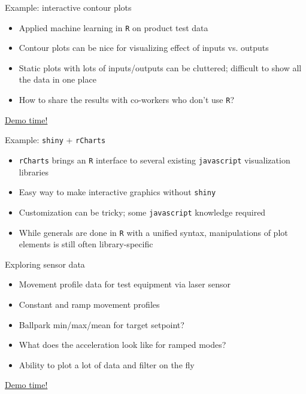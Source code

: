\documentclass[sans,aspectratio=169,presentation,bigger,fleqn]{beamer}
\begin{document}
\begin{frame}[fragile,label=sec-12]{Example: interactive contour plots}
 \begin{itemize}
\item Applied machine learning in \texttt{R} on product test data
\item Contour plots can be nice for visualizing effect of inputs vs. outputs
\item Static plots with lots of inputs/outputs can be cluttered; difficult to show all the
data in one place
\item How to share the results with co-workers who don't use \texttt{R}?
\end{itemize}

\pause

\href{https://jwhendy.shinyapps.io/interactive-contour/}{\alert{Demo time!}}
\end{frame}

\begin{frame}[fragile,label=sec-13]{Example: \texttt{shiny} + \texttt{rCharts}}
 \begin{itemize}
\item \texttt{rCharts} brings an \texttt{R} interface to several existing \texttt{javascript} visualization
libraries
\item Easy way to make interactive graphics without \texttt{shiny}
\item Customization can be tricky; some \texttt{javascript} knowledge required
\item While generals are done in \texttt{R} with a unified syntax, manipulations of plot elements is
still often library-specific
\end{itemize}
\end{frame}

\begin{frame}[label=sec-14]{Exploring sensor data}
\begin{itemize}
\item Movement profile data for test equipment via laser sensor
\item Constant and ramp movement profiles
\item Ballpark min/max/mean for target setpoint?
\item What does the acceleration look like for ramped modes?
\item Ability to plot a lot of data and filter on the fly
\end{itemize}

\pause

\href{https://jwhendy.shinyapps.io/shiny-rcharts/}{\alert{Demo time!}}
\end{frame}
\end{document}
